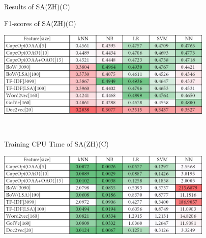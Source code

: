 \caption{Results of SA(ZH)(C)}
\label{tab:sa_zh_c}
\centering
\begin{subtable}{\textwidth}
	\centering
	\caption{F1-scores of SA(ZH)(C)}
	\includegraphics[width=0.8\textwidth]{./figure/02A3.png}
\end{subtable}\\[1em]
\begin{subtable}{\textwidth}
	\centering
	\caption{Training CPU Time of SA(ZH)(C)}
	\includegraphics[width=0.8\textwidth]{./figure/02A3t.png}
\end{subtable}
